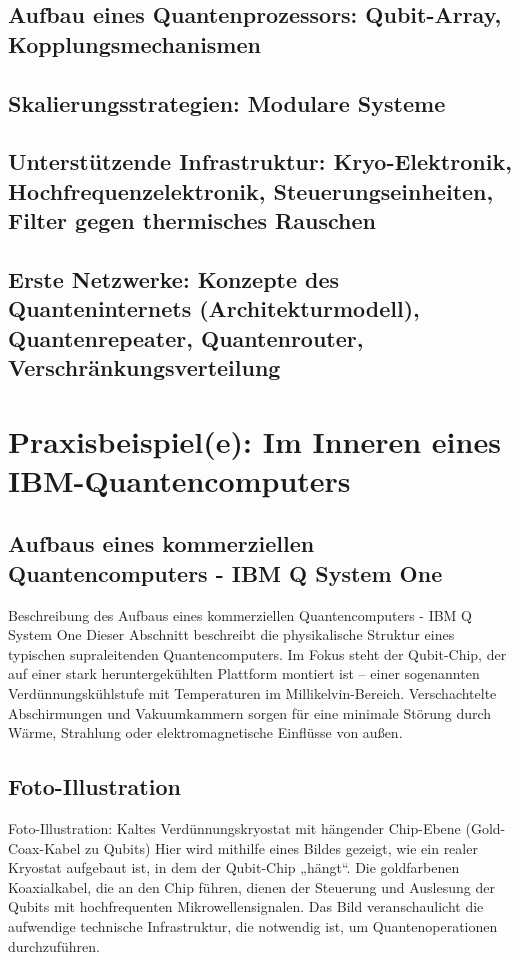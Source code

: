 \subsection{Aufbau eines Quantenprozessors: Qubit-Array, Kopplungsmechanismen}
\subsection{Skalierungsstrategien: Modulare Systeme}
\subsection{Unterstützende Infrastruktur: Kryo-Elektronik, Hochfrequenzelektronik, Steuerungseinheiten, Filter gegen thermisches Rauschen}
\subsection{Erste Netzwerke: Konzepte des Quanteninternets (Architekturmodell), Quantenrepeater, Quantenrouter, Verschränkungsverteilung}

\section{Praxisbeispiel(e): Im Inneren eines IBM-Quantencomputers}

\subsection{Aufbaus eines kommerziellen Quantencomputers - IBM Q System One}
Beschreibung des Aufbaus eines kommerziellen Quantencomputers - IBM Q System One
Dieser Abschnitt beschreibt die physikalische Struktur eines typischen supraleitenden Quantencomputers. Im Fokus steht der Qubit-Chip, der auf einer stark heruntergekühlten Plattform montiert ist – einer sogenannten Verdünnungskühlstufe mit Temperaturen im Millikelvin-Bereich. Verschachtelte Abschirmungen und Vakuumkammern sorgen für eine minimale Störung durch Wärme, Strahlung oder elektromagnetische Einflüsse von außen.

\subsection{Foto-Illustration}
Foto-Illustration: Kaltes Verdünnungskryostat mit hängender Chip-Ebene (Gold-Coax-Kabel zu Qubits)
Hier wird mithilfe eines Bildes gezeigt, wie ein realer Kryostat aufgebaut ist, in dem der Qubit-Chip „hängt“. Die goldfarbenen Koaxialkabel, die an den Chip führen, dienen der Steuerung und Auslesung der Qubits mit hochfrequenten Mikrowellensignalen. Das Bild veranschaulicht die aufwendige technische Infrastruktur, die notwendig ist, um Quantenoperationen durchzuführen.


